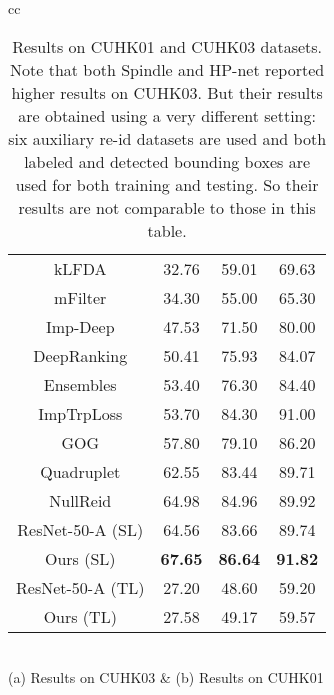 \documentclass[10pt,letterpaper,twocolumn,10pt,letterpaper,twocolumn]{article}
\providecommand{\tabularnewline}{\\}
\begin{document}
\begin{table*}[t]
\begin{centering}
\begin{tabular}{cc}
\begin{tabular}{c||ccc}
{\small{}{}{}kLFDA \cite{kLFDA}}  & {\small{}{}{}32.76}  & {\small{}{}{}59.01}  & {\small{}{}{}69.63}\tabularnewline
{\small{}{}{}mFilter \cite{mFilter}}  & {\small{}{}{}34.30}  & {\small{}{}{}55.00}  & {\small{}{}{}65.30}\tabularnewline
{\small{}{}{}Imp-Deep \cite{Ejaz_cvpr2015}}  & {\small{}{}{}47.53}  & {\small{}{}{}71.50}  & {\small{}{}{}80.00}\tabularnewline
{\small{}{}{}DeepRanking \cite{deepranking2016TIP}}  & {\small{}{}{}50.41}  & {\small{}{}{}75.93}  & {\small{}{}{}84.07}\tabularnewline
{\small{}{}{}Ensembles \cite{Ensembles}}  & {\small{}{}{}53.40}  & {\small{}{}{}76.30}  & {\small{}{}{}84.40}\tabularnewline
{\small{}{}{}ImpTrpLoss \cite{ImpTrpLoss}}  & {\small{}{}{}53.70}  & {\small{}{}{}84.30}  & {\small{}{}{}91.00}\tabularnewline
{\small{}{}{}GOG \cite{GOG}}  & {\small{}{}{}57.80}  & {\small{}{}{}79.10}  & {\small{}{}{}86.20}\tabularnewline
{\small{}{}{}Quadruplet \cite{quadruplet}}  & {\small{}{}{}62.55}  & {\small{}{}{}83.44}  & {\small{}{}{}89.71}\tabularnewline
{\small{}{}{}NullReid \cite{NullReid}}  & {\small{}{}{}64.98}  & {\small{}{}{}84.96}  & {\small{}{}{}89.92}\tabularnewline
\hline 
\hline 
{\small{}{}ResNet-50-A} (SL) & {\small{}{}{}64.56}  & {\small{}{}{}83.66}  & {\small{}{}{}89.74}\tabularnewline
{\small{}{}{}Ours (SL)}  & \textbf{\small{}{}{}67.65}{\small{} } & \textbf{\small{}{}{}86.64}{\small{} } & \textbf{\small{}{}{}91.82}\tabularnewline
\hline 
{\small{}{}ResNet-50-A} (TL) & 27.20 & 48.60 & 59.20\tabularnewline
Ours (TL)  & 27.58 & 49.17 & 59.57\tabularnewline
\hline 
\end{tabular}\tabularnewline
(a) Results on CUHK03  & (b) Results on CUHK01\tabularnewline
\end{tabular}
\par\end{centering}
\caption{\label{tab:Results-of-CUHK03.}Results on CUHK01 and CUHK03 datasets.
Note that both Spindle \cite{zhao2017spindle} and HP-net \cite{liu2017hydraplus}
reported higher results on CUHK03. But their results are obtained
using a very different setting: six auxiliary re-id datasets are used
and both labeled and detected bounding boxes are used for both training
and testing. So their results are not comparable to those in this
table.}
\end{table*}
\end{document}
